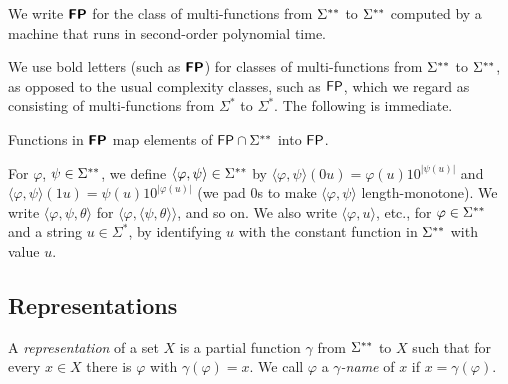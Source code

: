 \documentclass[a4paper,UKenglish]{lipics}
\begin{document}
\begin{definition}
 We write $\text{\bfseries \sffamily \upshape FP}$ for the class of
 multi-functions from $\Sigma ^{**}$ to $\Sigma ^{**}$ 
 computed by a machine that runs
 in second-order polynomial time.
\end{definition}

We use bold letters (such as $\text{\bfseries \sffamily \upshape FP}$) 
for classes of multi-functions from $\Sigma ^{**}$ to $\Sigma ^{**}$, 
as opposed to the usual complexity classes, such as $\mathsf{FP}$, 
which we regard as consisting of multi-functions from $\Sigma ^*$ to $\Sigma ^*$.
The following is immediate. 

\begin{lemma}
\label{lemma: classFPtwo maps classFP to classFP}
 Functions in $\text{\bfseries \sffamily \upshape FP}$ map 
 elements of $\mathsf{FP} \cap \Sigma ^{**}$ into $\mathsf{FP}$.
\end{lemma}

For $\varphi$, $\psi \in \Sigma ^{**}$, 
we define $\langle \varphi, \psi \rangle \in \Sigma ^{**}$ by 
$\langle \varphi, \psi \rangle(0u) = \varphi(u) 10^{|\psi(u)|}$ and 
$\langle \varphi, \psi \rangle(1u) = \psi(u) 10^{|\varphi(u)|}$
(we pad $0$s to make $\langle \varphi, \psi \rangle$ length-monotone).
We write $\langle \varphi, \psi, \theta \rangle$ 
for $\langle \varphi, \langle \psi, \theta \rangle \rangle$, and so on.
We also write $\langle \varphi, u \rangle$, etc., for 
$\varphi \in \Sigma ^{**}$ and a string $u \in \Sigma ^*$, 
by identifying $u$ with the constant function in $\Sigma ^{**}$ with value $u$. 

\subsection{Representations}
\label{subsection: representations}

A \emph{representation} of a set $X$ 
is a partial function $\gamma$ from $\Sigma ^{**}$ to $X$
such that for every $x \in X$ there is $\varphi$ with $\gamma (\varphi) = x$.
We call $\varphi$ a {\em $\gamma$-name} of $x$
if $x = \gamma (\varphi)$.
\end{document}
